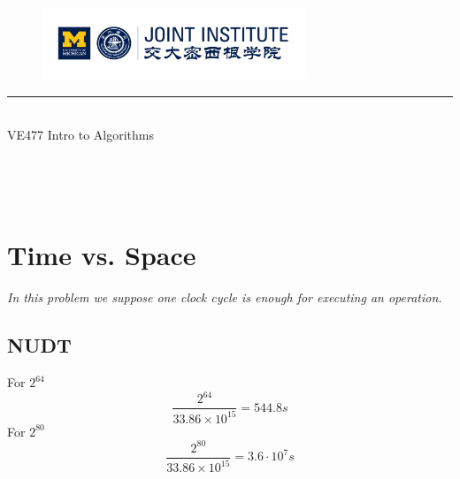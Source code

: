 \documentclass[A4paper]{article}
\begin{document}
\setmainfont{Cormorant Upright}
\renewcommand\arraystretch{1.5}


\thispagestyle{empty}

\begin{center}
\begin{large}
\begin{figure}[!htbp]
\centering
\includegraphics[width=0.7\textwidth]{Logo2}
\end{figure}
\hrule
\vspace*{0.25cm}
 \\
\Large  VE477 Intro to Algorithms\\
\end{large}
\hrulefill

\vspace*{3cm}

\begin{Large}
 \\
\end{Large}
\vspace*{2cm}
\begin{large}
 \\
\end{large}
\end{center}
\newpage
\setmainfont{Optima}
\setmonofont{Optima}
\setsansfont{Optima}
\setcounter{page}{1}
\section{Time vs. Space}
\textit{In this problem we suppose one clock cycle is enough for executing an operation.}
\subsection{NUDT}
For $2^{64}$
\begin{equation*}
	\frac{2^{64}}{33.86\times 10^{15}} = 544.8 s
\end{equation*}
For $2^{80}$
\[
	\frac{2^{80}}{33.86\times 10^{15}} = 3.6\cdot 10^7 s
\]
\end{document}
